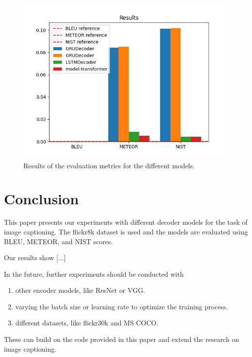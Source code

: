 \documentclass[12pt]{article}
\theoremstyle{plain}
\theoremstyle{definition}
\theoremstyle{remark}
\begin{document}
\begin{figure}[H]
    \centering
    \includegraphics[width=.9\textwidth]{res/metrics.png}
    \caption{Results of the evaluation metrics for the different models.}\label{fig:results}
\end{figure}



\section{Conclusion}\label{sec:conclusion}

This paper presents our experiments with different decoder models for the task of image captioning. The flickr8k dataset is used and the models are evaluated using BLEU, METEOR, and NIST scores.
\par Our results show [...] %
\par In the future, further experiments should be conducted with
\begin{enumerate}
    \item other encoder models, like ResNet or VGG.
    \item varying the batch size or learning rate to optimize the training process.
    \item different datasets, like flickr30k and MS COCO.
\end{enumerate}
These can build on the code provided in this paper and extend the research on image captioning.



\newpage
\thispagestyle{empty}



\end{document}
